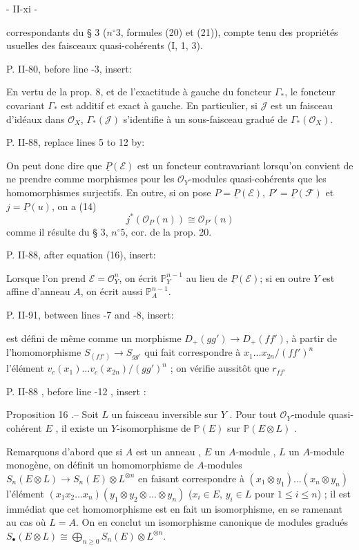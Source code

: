 \newpage


- II-xi -

correspondants du § 3 ($n^\circ 3$, formules (20) et (21)), compte tenu des propriétés usuelles des faisceaux quasi-cohérents (I, 1, 3).

P. II-80, before line -3, insert:

En vertu de la prop. 8, et de l'exactitude à gauche du foncteur $\Gamma_*$, le foncteur covariant $\Gamma_*$ est additif et exact à gauche. En particulier, si $\mathcal{J}$ est un faisceau d'idéaux dans $\mathcal{O}_X$, $\Gamma_*(\mathcal{J})$ s'identifie à un sous-faisceau gradué de $\Gamma_*(\mathcal{O}_X)$.

P. II-88, replace lines 5 to 12 by:

On peut donc dire que $\underline{P}(\mathcal{E})$ est un foncteur contravariant lorsqu'on convient de ne prendre comme morphismes pour les $\mathcal{O}_Y$-modules quasi-cohérents que les homomorphismes surjectifs. En outre, si on pose $P=\underline{P}(\mathcal{E})$, $P'=\underline{P}(\mathcal{F})$ et $j=\underline{P}(u)$, on a
(14) $$ j^*(\mathcal{O}_P(n)) \cong \mathcal{O}_{P'}(n) $$
comme il résulte du § 3, $n^\circ 5$, cor. de la prop. 20.

P. II-88, after equation (16), insert:

Lorsque l'on prend $\mathcal{E}=\mathcal{O}_Y^n$, on écrit $\mathbb{P}_Y^{n-1}$ au lieu de $\underline{P}(\mathcal{E})$; si en outre $Y$ est affine d'anneau $A$, on écrit aussi $\mathbb{P}_A^{n-1}$.

P. II-91, between lines -7 and -8, insert:

est défini de même comme un morphisme $D_+(gg') \to D_+(ff')$, à partir de l'homomorphisme $S_{(ff')} \to S_{gg'}$ qui fait correspondre à $x_1 \dots x_{2n}/(ff')^n$ l'élément $v_c(x_1) \dots v_c(x_{2n})/(gg')^n$ ; on vérifie aussitôt que $r_{ff'}$

\newpage


\noindent P. II-88 , before line -12 , insert :

\noindent Proposition 16 .-- Soit $L$ un faisceau inversible sur $Y$ . Pour tout $\mathcal{O}_Y$-module quasi-cohérent $E$ , il existe un $Y$-isomorphisme de $\mathbb{P}(E)$ sur $\mathbb{P}(E \otimes L)$ .

\noindent Remarquons d'abord que si $A$ est un anneau , $E$ un $A$-module , $L$ un $A$-module monogène, on définit un homomorphisme de $A$-modules $S_n(E \otimes L) \to S_n(E) \otimes L^{\otimes n}$ en faisant correspondre à $(x_1 \otimes y_1) \dots (x_n \otimes y_n)$ l'élément $(x_1 x_2 \dots x_n) (y_1 \otimes y_2 \otimes \dots \otimes y_n)$ ($x_i \in E$, $y_i \in L$ pour $1 \le i \le n$) ; il est immédiat que cet homomorphisme est en fait un isomorphisme, en se ramenant au cas où $L=A$. On en conclut un isomorphisme canonique de modules gradués $S_\bullet(E \otimes L) \cong \bigoplus_{n \ge 0} S_n(E) \otimes L^{\otimes n}$.

